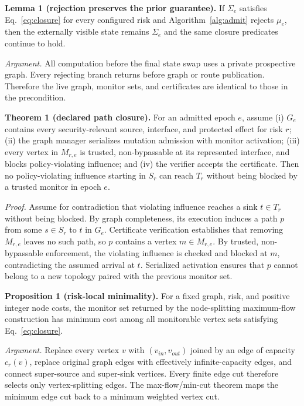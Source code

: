 \documentclass[10pt,journal,compsoc]{IEEEtran}
\begin{document}
\textbf{Lemma 1 (rejection preserves the prior guarantee).}
If $\Sigma_e$ satisfies Eq.~\eqref{eq:closure} for every configured risk and
Algorithm~\ref{alg:admit} rejects $\mu_e$, then the externally visible state
remains $\Sigma_e$ and the same closure predicates continue to hold.

\emph{Argument.}
All computation before the final state swap uses a private prospective graph.
Every rejecting branch returns before graph or route publication.  Therefore
the live graph, monitor sets, and certificates are identical to those in the
precondition.

\textbf{Theorem 1 (declared path closure).}
For an admitted epoch $e$, assume (i) $G_e$ contains every security-relevant
source, interface, and protected effect for risk $r$; (ii) the graph manager
serializes mutation admission with monitor activation; (iii) every vertex in
$M_{r,e}$ is trusted, non-bypassable at its represented interface, and blocks
policy-violating influence; and (iv) the verifier accepts the certificate.
Then no policy-violating influence starting in $S_r$ can reach $T_r$ without
being blocked by a trusted monitor in epoch $e$.

\emph{Proof.}
Assume for contradiction that violating influence reaches a sink $t\in T_r$
without being blocked.  By graph completeness, its execution induces a path
$p$ from some $s\in S_r$ to $t$ in $G_e$.  Certificate verification establishes
that removing $M_{r,e}$ leaves no such path, so $p$ contains a vertex
$m\in M_{r,e}$.  By trusted, non-bypassable enforcement, the violating
influence is checked and blocked at $m$, contradicting the assumed arrival at
$t$.  Serialized activation ensures that $p$ cannot belong to a new topology
paired with the previous monitor set.

\textbf{Proposition 1 (risk-local minimality).}
For a fixed graph, risk, and positive integer node costs, the monitor set
returned by the node-splitting maximum-flow construction has minimum cost among
all monitorable vertex sets satisfying Eq.~\eqref{eq:closure}.

\emph{Argument.}
Replace every vertex $v$ with $(v_{in},v_{out})$ joined by an edge of capacity
$c_r(v)$, replace original graph edges with effectively infinite-capacity
edges, and connect super-source and super-sink vertices.  Every finite edge cut
therefore selects only vertex-splitting edges.  The max-flow/min-cut theorem
maps the minimum edge cut back to a minimum weighted vertex cut.
\end{document}
